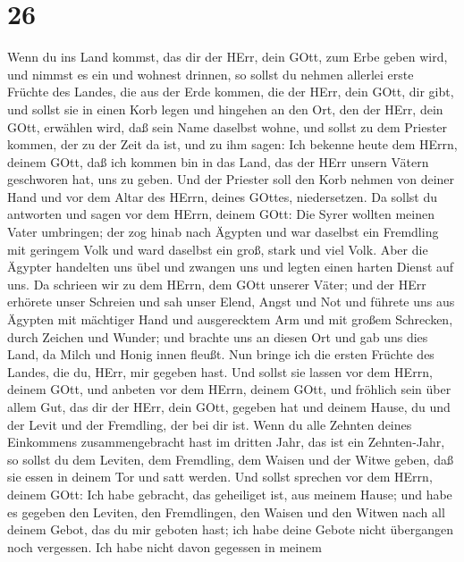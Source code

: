 \hypertarget{section-25}{%
\section{26}\label{section-25}}

 Wenn du ins Land kommst, das dir der HErr, dein GOtt, zum
Erbe geben wird, und nimmst es ein und wohnest drinnen,  so
sollst du nehmen allerlei erste Früchte des Landes, die aus der Erde
kommen, die der HErr, dein GOtt, dir gibt, und sollst sie in einen Korb
legen und hingehen an den Ort, den der HErr, dein GOtt, erwählen wird,
daß sein Name daselbst wohne,  und sollst zu dem Priester
kommen, der zu der Zeit da ist, und zu ihm sagen: Ich bekenne heute dem
HErrn, deinem GOtt, daß ich kommen bin in das Land, das der HErr unsern
Vätern geschworen hat, uns zu geben.  Und der Priester soll
den Korb nehmen von deiner Hand und vor dem Altar des HErrn, deines
GOttes, niedersetzen.  Da sollst du antworten und sagen vor
dem HErrn, deinem GOtt: Die Syrer wollten meinen Vater umbringen; der
zog hinab nach Ägypten und war daselbst ein Fremdling mit geringem Volk
und ward daselbst ein groß, stark und viel Volk.  Aber die
Ägypter handelten uns übel und zwangen uns und legten einen harten
Dienst auf uns.  Da schrieen wir zu dem HErrn, dem GOtt
unserer Väter; und der HErr erhörete unser Schreien und sah unser Elend,
Angst und Not  und führete uns aus Ägypten mit mächtiger
Hand und ausgerecktem Arm und mit großem Schrecken, durch Zeichen und
Wunder;  und brachte uns an diesen Ort und gab uns dies
Land, da Milch und Honig innen fleußt.  Nun bringe ich die
ersten Früchte des Landes, die du, HErr, mir gegeben hast. Und sollst
sie lassen vor dem HErrn, deinem GOtt, und anbeten vor dem HErrn, deinem
GOtt,  und fröhlich sein über allem Gut, das dir der HErr,
dein GOtt, gegeben hat und deinem Hause, du und der Levit und der
Fremdling, der bei dir ist.  Wenn du alle Zehnten deines
Einkommens zusammengebracht hast im dritten Jahr, das ist ein
Zehnten-Jahr, so sollst du dem Leviten, dem Fremdling, dem Waisen und
der Witwe geben, daß sie essen in deinem Tor und satt werden.
 Und sollst sprechen vor dem HErrn, deinem GOtt: Ich habe
gebracht, das geheiliget ist, aus meinem Hause; und habe es gegeben den
Leviten, den Fremdlingen, den Waisen und den Witwen nach all deinem
Gebot, das du mir geboten hast; ich habe deine Gebote nicht übergangen
noch vergessen.  Ich habe nicht davon gegessen in meinem
